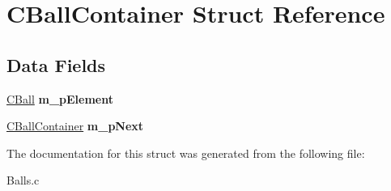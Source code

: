 \hypertarget{struct_c_ball_container}{}\section{C\+Ball\+Container Struct Reference}
\label{struct_c_ball_container}
\subsection*{Data Fields}
\begin{DoxyCompactItemize}
\item 
\mbox{\label{struct_c_ball_container_ad43f31163c0893d86d93b339b87c6fe8}} 
\hyperlink{struct_c_ball}{C\+Ball} {\bfseries m\+\_\+p\+Element}
\item 
\mbox{\label{struct_c_ball_container_a21b9f86246a4d45cdff6c3efe60c51bc}} 
\hyperlink{struct_c_ball_container}{C\+Ball\+Container} {\bfseries m\+\_\+p\+Next}
\end{DoxyCompactItemize}


The documentation for this struct was generated from the following file\+:\begin{DoxyCompactItemize}
\item 
Balls.\+c\end{DoxyCompactItemize}
